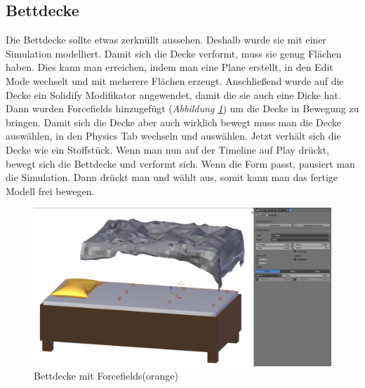 \subsection{Bettdecke}
\label{bettdecke:ref1}
Die Bettdecke sollte etwas zerknüllt aussehen. Deshalb wurde sie mit einer Simulation modelliert. Damit sich die Decke verformt, muss sie genug Flächen haben.
Dies kann man erreichen, indem man eine Plane erstellt, in den Edit Mode wechselt und mit   meherere Flächen erzeugt. Anschließend wurde auf die Decke ein Solidify Modifikator
angewendet, damit die sie auch eine Dicke hat.
Dann wurden Forcefields hinzugefügt (\textit{Abbildung \ref{Bettdecke:image1}}) um die Decke in Bewegung zu bringen. Damit sich die Decke aber auch wirklich bewegt muss man die Decke auswählen,
in den Physics Tab wechseln und  auswählen. Jetzt verhält sich die Decke wie ein Stoffstück. Wenn man nun auf der Timeline auf Play drückt, bewegt sich die Bettdecke und verformt sich.
Wenn die Form passt, pausiert man die Simulation. Dann drückt man  und wählt  aus, somit kann man das fertige Modell
frei bewegen.

\begin{figure}[H]
    \centering
    \includegraphics[width=.8\textwidth]{images/Bettdecke_Forcefields.png}
    \caption{Bettdecke mit Forcefields(orange)}
    \label{Bettdecke:image1}
\end{figure}
\flushbottom